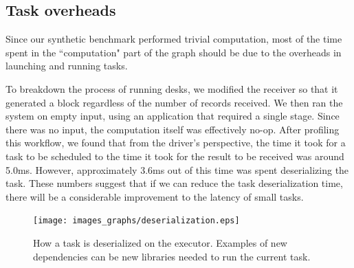 %
%
\subsection{Task overheads}

Since our synthetic benchmark performed trivial computation, most of the time spent in the ``computation" part of the graph should be due to the overheads in launching and running tasks. 

To breakdown the process of running desks, we modified the receiver so that it generated a block regardless of the number of records received. We then ran the system on empty input, using an application that required a single stage. Since there was no input, the computation itself was effectively no-op. After profiling this workflow, we found that from the driver's perspective, the time it took for a task to be scheduled to the time it took for the result to be received was around 5.0ms. However, approximately 3.6ms out of this time was spent deserializing the task. These numbers suggest that if we can reduce the task deserialization time, there will be a considerable improvement to the latency of small tasks.

\begin{figure}[t!]
 \begin{center}
   \texttt{[image: images\_graphs/deserialization.eps]}
 \end{center}
 \caption{How a task is deserialized on the executor. Examples of new dependencies can be new libraries needed to run the current task.}
 \label{fig:deserialization}
\end{figure}

